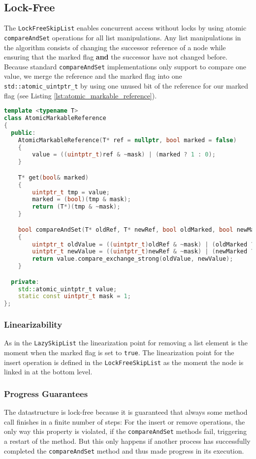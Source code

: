 \subsection{Lock-Free}
The \texttt{LockFreeSkipList} \cite{Herlihy:2008:AMP:1734069} enables concurrent access without locks by using atomic \texttt{compareAndSet} operations for all list manipulations. Any list manipulations in the algorithm consists of changing the successor reference of a node while ensuring that the marked flag \textbf{and} the successor have not changed before. Because standard \texttt{compareAndSet} implementations only support to compare one value, we merge the reference and the marked flag into one \texttt{std::atomic\_uintptr\_t} by using one unused bit of the reference for our marked flag (see Listing \ref{lst:atomic_markable_reference}).

\begin{lstlisting}[language=C++, caption={AtomicMarkableReference}, label=lst:atomic_markable_reference]
template <typename T>
class AtomicMarkableReference
{
  public:
    AtomicMarkableReference(T* ref = nullptr, bool marked = false)
    {
        value = ((uintptr_t)ref & ~mask) | (marked ? 1 : 0);
    }

    T* get(bool& marked)
    {
        uintptr_t tmp = value;
        marked = (bool)(tmp & mask);
        return (T*)(tmp & ~mask);
    }

    bool compareAndSet(T* oldRef, T* newRef, bool oldMarked, bool newMarked)
    {
        uintptr_t oldValue = ((uintptr_t)oldRef & ~mask) | (oldMarked ? 1 : 0);
        uintptr_t newValue = ((uintptr_t)newRef & ~mask) | (newMarked ? 1 : 0);
        return value.compare_exchange_strong(oldValue, newValue);
    }

  private:
    std::atomic_uintptr_t value;
    static const uintptr_t mask = 1;
};
\end{lstlisting}

\subsubsection*{Linearizability}
\noindent As in the \texttt{LazySkipList} the linearization point for removing a list element is the moment when the marked flag is set to \texttt{true}. The linearization point for the insert operation is defined in the \texttt{LockFreeSkipList} as the moment the node is linked in at the bottom level.

\subsubsection*{Progress Guarantees}
The datastructure is lock-free because it is guaranteed that always some method call finishes in a finite number of steps: For the insert or remove operations, the only way this property is violated, if the \texttt{compareAndSet} methods fail, triggering a restart of the method. But this only happens if another process has successfully completed the \texttt{compareAndSet} method and thus made progress in its execution.\\

